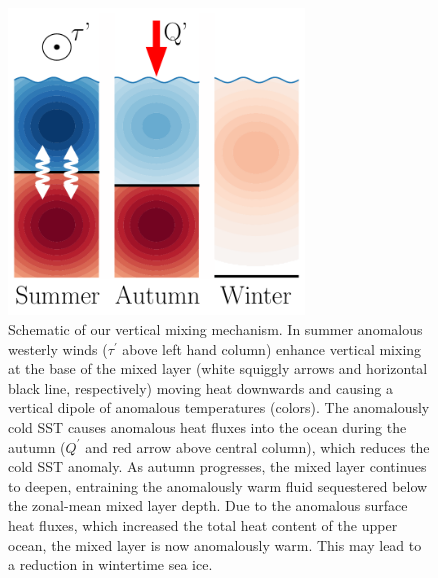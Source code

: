 \documentclass{ametsocV5}
\begin{document}
\begin{figure}[!ht]
    \begin{center}
        \includegraphics[width=0.7\textwidth]{figures/wind_mixing_schematic.pdf}
        \caption{Schematic of our vertical mixing mechanism. In summer anomalous westerly winds ($\tau^{'}$ above left hand column) enhance vertical mixing at the base of the mixed layer (white squiggly arrows and horizontal black line, respectively) moving heat downwards and causing a vertical dipole of anomalous temperatures (colors). The anomalously cold SST causes anomalous heat fluxes into the ocean during the autumn ($Q^{'}$ and red arrow above central column), which reduces the cold SST anomaly. As autumn progresses, the mixed layer continues to deepen, entraining the anomalously warm fluid sequestered below the zonal-mean mixed layer depth. Due to the anomalous surface heat fluxes, which increased the total heat content of the upper ocean, the mixed layer is now anomalously warm. This may lead to a reduction in wintertime sea ice.}
        \label{fig:wind_mixing_schematic}
    \end{center}
\end{figure}


\end{document}
